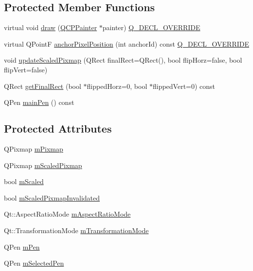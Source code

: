 \subsection*{Protected Member Functions}
\begin{DoxyCompactItemize}
\item 
virtual void \mbox{\hyperlink{class_q_c_p_item_pixmap_a9538a7d37fe20a4ff4bb2cb5bbbf2b48}{draw}} (\mbox{\hyperlink{class_q_c_p_painter}{Q\+C\+P\+Painter}} $\ast$painter) \mbox{\hyperlink{qcustomplot_8h_a42cc5eaeb25b85f8b52d2a4b94c56f55}{Q\+\_\+\+D\+E\+C\+L\+\_\+\+O\+V\+E\+R\+R\+I\+DE}}
\item 
virtual Q\+PointF \mbox{\hyperlink{class_q_c_p_item_pixmap_a5803d8e173bc4d48619fc43701db32e5}{anchor\+Pixel\+Position}} (int anchor\+Id) const \mbox{\hyperlink{qcustomplot_8h_a42cc5eaeb25b85f8b52d2a4b94c56f55}{Q\+\_\+\+D\+E\+C\+L\+\_\+\+O\+V\+E\+R\+R\+I\+DE}}
\item 
void \mbox{\hyperlink{class_q_c_p_item_pixmap_a8bced3027b326b290726cd1979c7cfc6}{update\+Scaled\+Pixmap}} (Q\+Rect final\+Rect=Q\+Rect(), bool flip\+Horz=false, bool flip\+Vert=false)
\item 
Q\+Rect \mbox{\hyperlink{class_q_c_p_item_pixmap_a4e7d803e5093c457a109f8fae56677c2}{get\+Final\+Rect}} (bool $\ast$flipped\+Horz=0, bool $\ast$flipped\+Vert=0) const
\item 
Q\+Pen \mbox{\hyperlink{class_q_c_p_item_pixmap_aad6dddd67163831538d40023a98a9fe7}{main\+Pen}} () const
\end{DoxyCompactItemize}
\subsection*{Protected Attributes}
\begin{DoxyCompactItemize}
\item 
Q\+Pixmap \mbox{\hyperlink{class_q_c_p_item_pixmap_a1396cce7f26c7b8e9512906284380c4d}{m\+Pixmap}}
\item 
Q\+Pixmap \mbox{\hyperlink{class_q_c_p_item_pixmap_a2ebc66e15b9f1264563d58f29ba1bc00}{m\+Scaled\+Pixmap}}
\item 
bool \mbox{\hyperlink{class_q_c_p_item_pixmap_a8fe670a529cd46a9b8afd9fc1203bc3f}{m\+Scaled}}
\item 
bool \mbox{\hyperlink{class_q_c_p_item_pixmap_a223134abd4cf3d6c368573c622bd2e1c}{m\+Scaled\+Pixmap\+Invalidated}}
\item 
Qt\+::\+Aspect\+Ratio\+Mode \mbox{\hyperlink{class_q_c_p_item_pixmap_a8dc6b6c1e106ac523efae22d5fe55bab}{m\+Aspect\+Ratio\+Mode}}
\item 
Qt\+::\+Transformation\+Mode \mbox{\hyperlink{class_q_c_p_item_pixmap_ac9ecad3b9842363754e32eda2cf821bd}{m\+Transformation\+Mode}}
\item 
Q\+Pen \mbox{\hyperlink{class_q_c_p_item_pixmap_acfee1124eb51a1887aaf8de10777c7a1}{m\+Pen}}
\item 
Q\+Pen \mbox{\hyperlink{class_q_c_p_item_pixmap_a0949e5bb6a261fc4e9668e28e2effcfa}{m\+Selected\+Pen}}
\end{DoxyCompactItemize}
